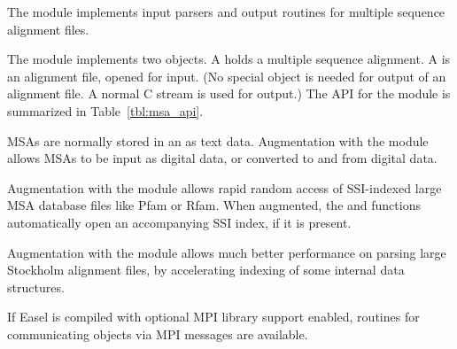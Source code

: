 The  module implements input parsers and output routines
for multiple sequence alignment files. 

The module implements two objects. A  holds a multiple
sequence alignment. A  is an alignment file,
opened for input. (No special object is needed for output of an
alignment file. A normal C  stream is used for output.)
The API for the  module is summarized in
Table~\ref{tbl:msa_api}.

MSAs are normally stored in an  as text data.
Augmentation with the  module allows MSAs to be input
as digital data, or converted to and from digital data. 

Augmentation with the  module allows rapid random access
of SSI-indexed large MSA database files like Pfam or Rfam. When
augmented, the  and
 functions automatically open an
accompanying SSI index, if it is present.

Augmentation with the  module allows much better
performance on parsing large Stockholm alignment files, by
accelerating indexing of some internal data structures.

If Easel is compiled with optional MPI library support enabled,
routines for communicating  objects via MPI messages
are available.

